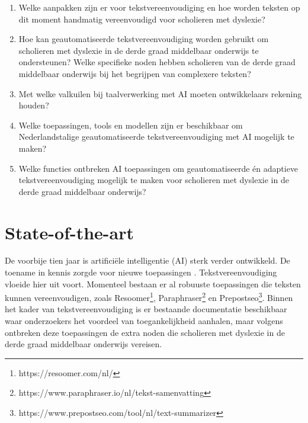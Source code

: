   

\begin{enumerate}
	\item Welke aanpakken zijn er voor tekstvereenvoudiging en hoe worden teksten op dit moment handmatig vereenvoudigd voor scholieren met dyslexie?
	\item Hoe kan geautomatiseerde tekstvereenvoudiging worden gebruikt om scholieren met dyslexie in de derde graad middelbaar onderwijs te ondersteunen? Welke specifieke noden hebben scholieren van de derde graad middelbaar onderwijs bij het begrijpen van \newline complexere teksten?
	\item Met welke valkuilen bij taalverwerking met AI moeten ontwikkelaars rekening houden?
	\item Welke toepassingen, tools en modellen zijn er beschikbaar om Nederlandstalige geautomatiseerde tekstvereenvoudiging met AI mogelijk te maken?
	\item Welke functies ontbreken AI toepassingen om geautomatiseerde én adaptieve tekstvereenvoudiging mogelijk te maken voor scholieren met dyslexie in de derde graad middelbaar onderwijs?
\end{enumerate}


\section{State-of-the-art}%
\label{sec:state-of-the-art}


De voorbije tien jaar is artificiële intelligentie (AI) sterk verder ontwikkeld. De toename in kennis zorgde voor nieuwe toepassingen \autocite{Vasista2022}. Tekstvereenvoudiging vloeide hier uit voort. Momenteel bestaan er al robuuste toepassingen die teksten kunnen vereenvoudigen, zoals Resoomer\footnote{https://resoomer.com/nl/}, Paraphraser\footnote{https://www.paraphraser.io/nl/tekst-samenvatting} en Prepostseo\footnote{https://www.prepostseo.com/tool/nl/text-summarizer}. Binnen het kader van tekstvereenvoudiging is er bestaande documentatie beschikbaar waar onderzoekers het voordeel van toegankelijkheid aanhalen, maar volgens \textcite{Gooding2022} ontbreken deze toepassingen de extra noden die scholieren met dyslexie in de derde graad middelbaar onderwijs vereisen.

